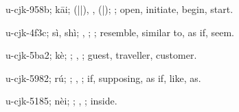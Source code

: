\begin{multicols}{2}
{\cjkgGlue{}u-cjk-958b; kāi; \cjkgGlue{}\cjkgGlue{}(\cjkgGlue{}|\cjkgGlue{}|\cjkgGlue{}), \cjkgGlue{}\cjkgGlue{}\cjkgGlue{}, \cjkgGlue{}\cjkgGlue{}(\cjkgGlue{}|\cjkgGlue{}); \cjkgGlue{}; open, initiate, begin, start.

\cjkgGlue{}u-cjk-4f3c; sì, shì; \cjkgGlue{}\cjkgGlue{}\cjkgGlue{}, \cjkgGlue{}\cjkgGlue{}\cjkgGlue{}; \cjkgGlue{}; resemble, similar to, as if, seem.

\cjkgGlue{}u-cjk-5ba2; kè; \cjkgGlue{}; \cjkgGlue{}, \cjkgGlue{}; guest, traveller, customer.

\cjkgGlue{}u-cjk-5982; rú; \cjkgGlue{}\cjkgGlue{}\cjkgGlue{}; \cjkgGlue{}, \cjkgGlue{}; if, supposing, as if, like, as.

\cjkgGlue{}u-cjk-5185; nèi; \cjkgGlue{}; \cjkgGlue{}, \cjkgGlue{}; inside.

}
\end{multicols}
